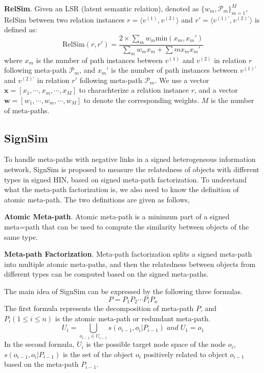 \documentclass{acm_proc_article-csis8101}
\begin{document}
\begin{definition}
{\bf RelSim}. Given an LSR (latent semantic relation), denoted as $\{w_{m}, \mathcal{P}_{m}\}^{M}_{m=1}$, RelSim between two 
relation instances $r = \langle v^{(1)}, v^{(2)} \rangle$ and $r' = \langle v^{(1)'}, v^{(2)'} \rangle$ is defined as:
\begin{equation}
\text{RelSim}(r, r') = \frac{2 \times \sum_{m}w_{m}\text{min}(x_{m}, x_{m}')}{\sum_{m}w_{m}x_{m}+\sum{m}x_{m}x_{m}'}
\end{equation}
where $x_{m}$ is the number of path instances between $v^{(1)}$ and $v^{(2)}$ in relation $r$ following meta-path $\mathcal{P}_{m}$, and $x_{m}'$ is the number of path instances between $v^{(1)'}$ and $v^{(2)'}$ in relation $r'$ following meta-path $\mathcal{P}_{m}$. We use a vector $\mathbf{x}=[x_1, \cdots, x_m, \cdots, x_{M}]$ to charachterize a relation instance $r$, and a vector $\mathbf{w}=[w_{1}, \cdots, w_{m}, \cdots, w_{M}]$ to denote the corresponding weights. $M$ is the number of meta-paths.
\end{definition}

\subsection{SignSim}

To handle meta-paths with negative links in a signed heterogeneous information network, SignSim\cite{zhu2015relevance} is proposed to measure the relatedness of objects with different types in signed HIN, based on signed meta-path factorization. To understand what the meta-path factorization is, we also need to know the definition of atomic meta-path. The two definitions are given as follows,

\begin{definition}
{\bf Atomic Meta-path}. Atomic meta-path is a minimum part of a signed meta=path that can be used to compute the similarity between objects of the same type.
\end{definition}

\begin{definition}
{\bf Meta-path Factorization}. Meta-path factorization splits a signed meta-path into multiple atomic meta-paths, and then the relatedness between objects from different types can be computed based on the signed meta-paths.
\end{definition}
The main  idea of SignSim can be expressed by the following three formulas.
\begin{equation}
P = P_{1}P_{2} \cdots P_{i} P_{n}
\end{equation}
The first formula represents the decomposition of meta-path $P$, and $P_{i}(1 \leq i \leq n)$ is the atomic meta-path or redundant meta-path. 
\begin{equation}
U_{i} = \bigcup\limits_{o_{i-1} \in U_{i-1}}s(o_{i-1}, o_{i}|P_{i-1}) \;and\; U_{1} = o_{1}
\end{equation}
In the second formula, $U_{i}$ is the possible target node space of the node $o_{i}$, $s(o_{i-1}, o_{i}|P_{i-1})$ is the set of the object $o_{i}$ positively related to object $o_{i-1}$ based on the meta-path $P_{i-1}$.
\end{document}
